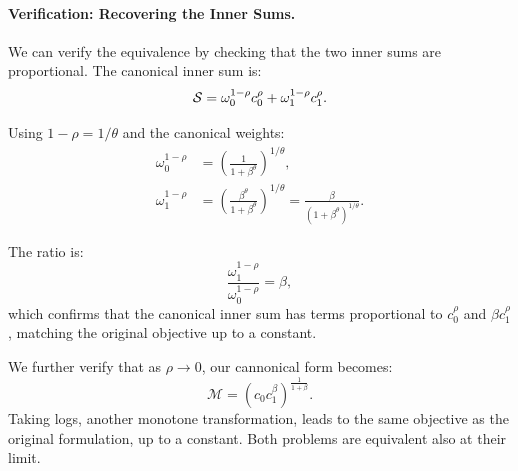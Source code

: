 \paragraph{Verification: Recovering the Inner Sums.}
We can verify the equivalence by checking that the two inner sums are proportional. The canonical inner sum is:
\begin{equation}
\mathcal{S} = \omega_0^{1-\rho} c_0^{\rho} + \omega_1^{1-\rho} c_1^{\rho}.
\label{eq:canonical-inner-inter}
\end{equation}

Using $1 - \rho = 1/\theta$ and the canonical weights:
\begin{align}
\omega_0^{1-\rho} &= \left( \frac{1}{1+\beta^{\theta}} \right)^{1/\theta}, \\[4pt]
\omega_1^{1-\rho} &= \left( \frac{\beta^{\theta}}{1+\beta^{\theta}} \right)^{1/\theta} = \frac{\beta}{(1+\beta^{\theta})^{1/\theta}}.
\label{eq:canonical-powers}
\end{align}

The ratio is:
\begin{equation}
\frac{\omega_1^{1-\rho}}{\omega_0^{1-\rho}} = \beta,
\label{eq:weight-ratio}
\end{equation}
which confirms that the canonical inner sum has terms proportional to $c_0^{\rho}$ and $\beta c_1^{\rho}$, matching the original objective up to a constant.

We further verify that as $\rho \rightarrow 0$, our cannonical form becomes:
\[\mathcal{M}=\left(c_0c_1^{\beta}\right)^{\frac{1}{1+\beta}}.
\]
Taking logs, another monotone transformation, leads to the same objective as the original formulation, up to a constant. Both problems are equivalent also at their limit. 

